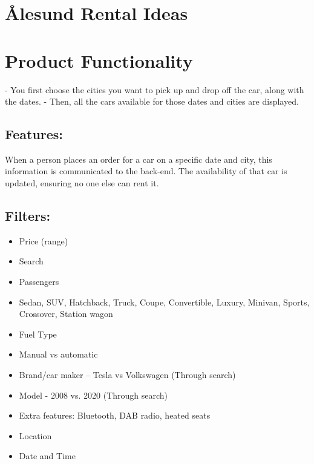 \documentclass{article}
\begin{document}
\section{Ålesund Rental Ideas}


\section{Product Functionality}

- You first choose the cities you want to pick up and drop off the car, along with the dates.
- Then, all the cars available for those dates and cities are displayed.

\subsection{Features:}

When a person places an order for a car on a specific date and city, this information is communicated to the back-end. The availability of that car is updated, ensuring no one else can rent it.

\subsection{Filters:}
\begin{itemize}
    \item Price (range)
    \item Search
    \item Passengers
    \item Sedan, SUV, Hatchback, Truck, Coupe, Convertible, Luxury, Minivan, Sports, Crossover, Station wagon
    \item Fuel Type
    \item Manual vs automatic
    \item Brand/car maker – Tesla vs Volkswagen (Through search)
    \item Model - 2008 vs. 2020 (Through search)
    \item Extra features: Bluetooth, DAB radio, heated seats
    \item Location
    \item Date and Time
\end{itemize}
\end{document}

